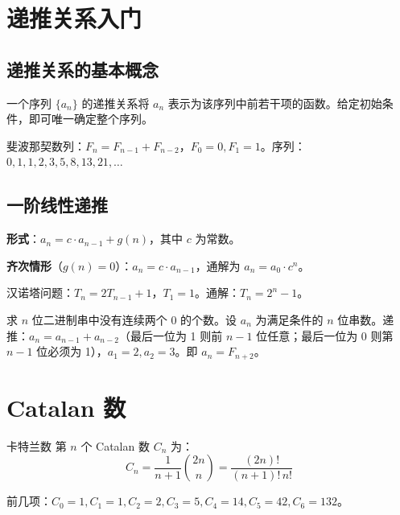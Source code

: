 \section{递推关系入门}

\subsection{递推关系的基本概念}

\begin{mydefinition}{}
一个序列 $\{a_n\}$ 的递推关系将 $a_n$ 表示为该序列中前若干项的函数。给定初始条件，即可唯一确定整个序列。
\end{mydefinition}

\begin{example}
斐波那契数列：$F_n = F_{n-1} + F_{n-2}$，$F_0 = 0, F_1 = 1$。序列：$0, 1, 1, 2, 3, 5, 8, 13, 21, \dots$
\end{example}

\subsection{一阶线性递推}

\textbf{形式}：$a_n = c \cdot a_{n-1} + g(n)$，其中 $c$ 为常数。

\textbf{齐次情形}（$g(n) = 0$）：$a_n = c \cdot a_{n-1}$，通解为 $a_n = a_0 \cdot c^n$。

\begin{example}
汉诺塔问题：$T_n = 2T_{n-1} + 1$，$T_1 = 1$。通解：$T_n = 2^n - 1$。
\end{example}

\begin{example}
求 $n$ 位二进制串中没有连续两个 0 的个数。设 $a_n$ 为满足条件的 $n$ 位串数。递推：$a_n = a_{n-1} + a_{n-2}$（最后一位为 1 则前 $n-1$ 位任意；最后一位为 0 则第 $n-1$ 位必须为 1），$a_1=2, a_2=3$。即 $a_n = F_{n+2}$。
\end{example}

\section{Catalan 数}

\begin{mydefinition}{{卡特兰数}}
第 $n$ 个 Catalan 数 $C_n$ 为：
\[
C_n = \frac{1}{n+1} \binom{2n}{n} = \frac{(2n)!}{(n+1)!\, n!}
\]
\end{mydefinition}

前几项：$C_0=1, C_1=1, C_2=2, C_3=5, C_4=14, C_5=42, C_6=132$。

